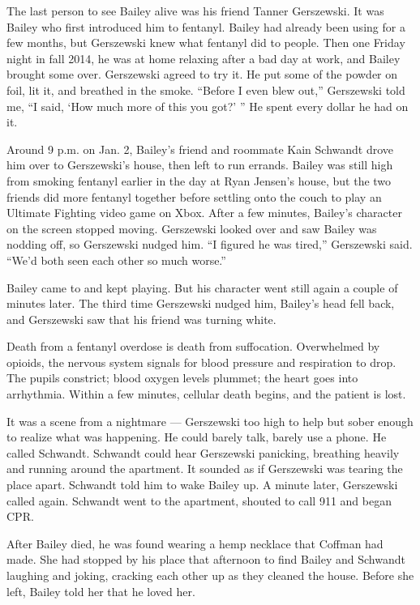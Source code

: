 The last person to see Bailey alive was his friend Tanner Gerszewski. It
was Bailey who first introduced him to fentanyl. Bailey had already been
using for a few months, but Gerszewski knew what fentanyl did to people.
Then one Friday night in fall 2014, he was at home relaxing after a bad
day at work, and Bailey brought some over. Gerszewski agreed to try it.
He put some of the powder on foil, lit it, and breathed in the smoke.
``Before I even blew out,'' Gerszewski told me, ``I said, `How much more
of this you got?' '' He spent every dollar he had on it.

Around 9 p.m. on Jan. 2, Bailey's friend and roommate Kain Schwandt
drove him over to Gerszewski's house, then left to run errands. Bailey
was still high from smoking fentanyl earlier in the day at Ryan Jensen's
house, but the two friends did more fentanyl together before settling
onto the couch to play an Ultimate Fighting video game on Xbox. After a
few minutes, Bailey's character on the screen stopped moving. Gerszewski
looked over and saw Bailey was nodding off, so Gerszewski nudged him.
``I figured he was tired,'' Gerszewski said. ``We'd both seen each other
so much worse.''

Bailey came to and kept playing. But his character went still again a
couple of minutes later. The third time Gerszewski nudged him, Bailey's
head fell back, and Gerszewski saw that his friend was turning white.

Death from a fentanyl overdose is death from suffocation. Overwhelmed by
opioids, the nervous system signals for blood pressure and respiration
to drop. The pupils constrict; blood oxygen levels plummet; the heart
goes into arrhythmia. Within a few minutes, cellular death begins, and
the patient is lost.

It was a scene from a nightmare --- Gerszewski too high to help but
sober enough to realize what was happening. He could barely talk, barely
use a phone. He called Schwandt. Schwandt could hear Gerszewski
panicking, breathing heavily and running around the apartment. It
sounded as if Gerszewski was tearing the place apart. Schwandt told him
to wake Bailey up. A minute later, Gerszewski called again. Schwandt
went to the apartment, shouted to call 911 and began CPR.

After Bailey died, he was found wearing a hemp necklace that Coffman had
made. She had stopped by his place that afternoon to find Bailey and
Schwandt laughing and joking, cracking each other up as they cleaned the
house. Before she left, Bailey told her that he loved her.

